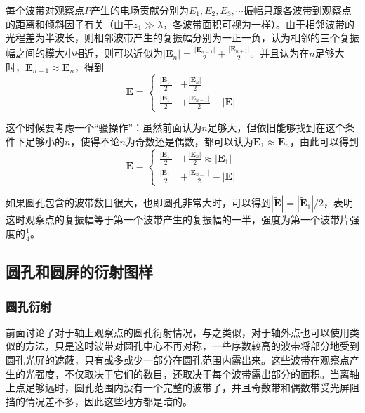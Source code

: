 \documentclass[UTF8]{ctexart}
\begin{document}
	每个波带对观察点$ P $产生的电场贡献分别为$ E_{1}, E_{2}, E_{3}, \cdots $振幅只跟各波带到观察点的距离和倾斜因子有关（由于$ z_{1} \gg \lambda $，各波带面积可视为一样）。由于相邻波带的光程差为半波长，则相邻波带产生的复振幅分别为一正一负，认为相邻的三个复振幅之间的模大小相近，则可以近似为$ |\boldsymbol{E}_{n}| = \frac{|\boldsymbol{E}_{n-1}|}{2} + \frac{|\boldsymbol{E}_{n+1}|}{2} $。并且认为在$ n $足够大时，$ \boldsymbol{E}_{n-1} \approx \boldsymbol{E}_{n} $，得到
	\begin{equation}
	\boldsymbol{E} = \left \{
	\begin{aligned}
	\frac{|\boldsymbol{E}_{1}|}{2} &+ \frac{|\boldsymbol{E}_{n}|}{2}
	\\
	\frac{|\boldsymbol{E}_{1}|}{2} &+ \frac{|\boldsymbol{E}_{n-1}|}{2} - |\boldsymbol{E}|
	\end{aligned}
	\right.
	\end{equation}
	
\noindent 这个时候要考虑一个“骚操作”：虽然前面认为$ n $足够大，但依旧能够找到在这个条件下足够小的$ n $，使得不论$ n $为奇数还是偶数，都可以认为$ \boldsymbol{E}_{1} \approx \boldsymbol{E}_{n} $，由此可以得到
\begin{equation}
\boldsymbol{E} = \left \{
\begin{aligned}
\frac{|\boldsymbol{E}_{1}|}{2} &+ \frac{|\boldsymbol{E}_{n}|}{2} \approx |\boldsymbol{E}_{1}|
\\
\frac{|\boldsymbol{E}_{1}|}{2} &+ \frac{|\boldsymbol{E}_{n-1}|}{2} - |\boldsymbol{E}|
\end{aligned}
\right.
\end{equation}

	如果圆孔包含的波带数目很大，也即圆孔非常大时，可以得到$ |\tilde{\boldsymbol{E}}| = |\tilde{\boldsymbol{E}}_{1}|/2 $，表明这时观察点的复振幅等于第一个波带产生的复振幅的一半，强度为第一个波带片强度的$ \frac{1}{4} $。
	
	\subsection{圆孔和圆屏的衍射图样}
	\subsubsection{圆孔衍射}
	前面讨论了对于轴上观察点的圆孔衍射情况，与之类似，对于轴外点也可以使用类似的方法，只是这时波带对圆孔中心不再对称，一些序数较高的波带将部分地受到圆孔光屏的遮蔽，只有或多或少一部分在圆孔范围内露出来。这些波带在观察点产生的光强度，不仅取决于它们的数目，还取决于每个波带露出部分的面积。当离轴上点足够远时，圆孔范围内没有一个完整的波带了，并且奇数带和偶数带受光屏阻挡的情况差不多，因此这些地方都是暗的。
	
\end{document}
